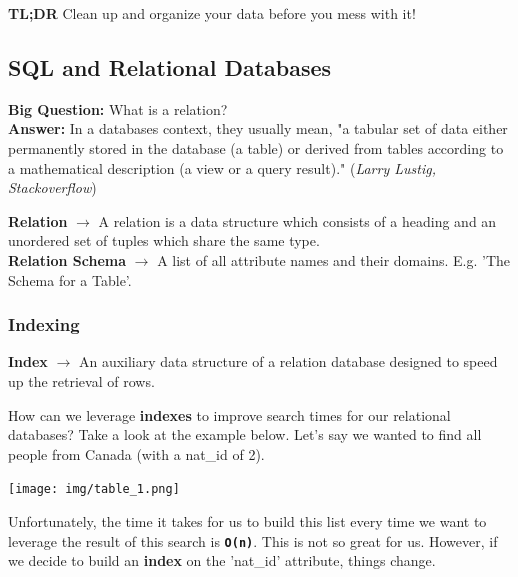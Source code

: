 \documentclass[english, 10pt]{article}
\begin{document}
\textbf{TL;DR} Clean up and organize your data before you mess with it!

\subsection{SQL and Relational Databases}

\textbf{Big Question:} What is a relation?\\
\textbf{Answer:} In a databases context, they usually mean, "a tabular set of data either permanently stored in the database (a table) or derived from tables according to a mathematical description (a view or a query result)." (\textit{Larry Lustig, Stackoverflow})\\

\begin{tcolorbox}[title=Definition:,colframe=red!75!black,colback=red!5!white,arc=0pt,fonttitle=\bfseries]
\textbf{Relation} $\rightarrow$ A relation is a data structure which consists of a heading and an unordered set of tuples which share the same type.\\
\textbf{Relation Schema} $\rightarrow$ A list of all attribute names and their domains. E.g. 'The Schema for a Table'.
\end{tcolorbox}

\subsubsection{Indexing}

\begin{tcolorbox}[title=Definition:,colframe=red!75!black,colback=red!5!white,arc=0pt,fonttitle=\bfseries]
\textbf{Index} $\rightarrow$ An auxiliary data structure of a relation database designed to speed up the retrieval of rows.
\end{tcolorbox}


\hfill \break How can we leverage \textbf{indexes} to improve search times for our relational databases? Take a look at the example below. Let's say we wanted to find all people from Canada (with a nat\_id of 2).\\

{
\centering

\texttt{[image: img/table\_1.png]} 

}

\hfill \break Unfortunately, the time it takes for us to build this list every time we want to leverage the result of this search is \texttt{\textbf{O(n)}}. This is not so great for us. However, if we decide to build an \textbf{index} on the 'nat\_id' attribute, things change. \\
\end{document}
